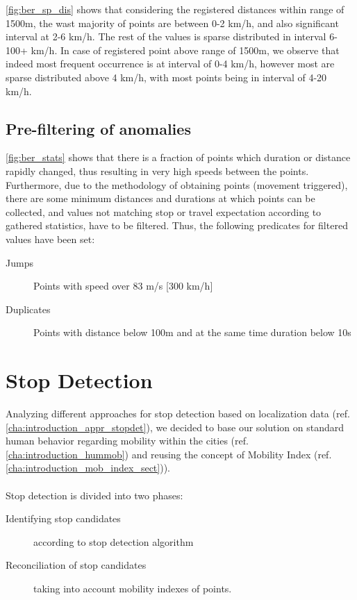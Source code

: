 \FloatBarrier
\autoref{fig:ber_sp_dis} shows that considering the registered distances within range of 1500m, the wast majority of points are between 0-2 km/h, and also significant interval at 2-6 km/h. The rest of the values is sparse distributed in interval 6-100+ km/h. In case of registered point above range of 1500m, we observe that indeed most frequent occurrence is at interval of 0-4 km/h, however most are sparse distributed above 4 km/h, with most points being in interval of 4-20 km/h. 

\subsection{Pre-filtering of anomalies}
\label{cha:prefilter}
\autoref{fig:ber_stats} shows that there is a fraction of points which duration or distance rapidly changed, thus resulting in very high speeds between the points. Furthermore, due to the methodology of obtaining points (movement triggered), there are some minimum distances and durations at which points can be collected, and values not matching stop or travel expectation according to gathered statistics, have to be filtered. Thus, the following predicates for filtered values have been set:
\begin{description}
	\item[Jumps] Points with speed over 83 m/s [300 km/h]
	\item[Duplicates] Points with distance below 100m and at the same time duration below 10s
\end{description}

\section{Stop Detection}

Analyzing different approaches for stop detection based on localization data (ref. \autoref{cha:introduction_appr_stopdet}), we decided to base our solution on standard human behavior regarding mobility within the cities (ref. \autoref{cha:introduction_hummob}) and reusing the concept of Mobility Index (ref. \autoref{cha:introduction_mob_index_sect})).
\\\\
Stop detection is divided into two phases:
\begin{description}
	\item[Identifying stop candidates] according to stop detection algorithm
	\item[Reconciliation of stop candidates] taking into account mobility indexes of points. 
\end{description}

